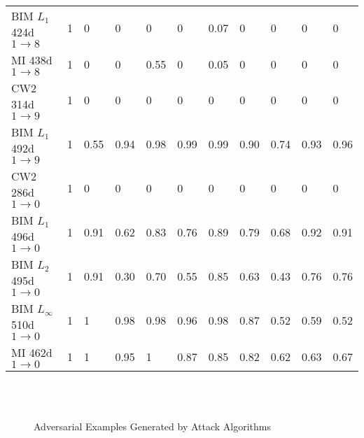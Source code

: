 \documentclass[12pt]{article}
\begin{document}
\begin{table}[t]
\begin{center}
{\begin{tabular}{|l|llllllllll|}
BIM $L_1$ 424d $1\to 8$& 1 & 0 & 0 & 0 & 0 & 0.07 & 0 & 0 & 0 & 0 \\
MI 438d $1\to 8$& 1 & 0 & 0 & 0.55 & 0 & 0.05 & 0 & 0 & 0 & 0 \\\hline
CW2 314d $1\to 9$& 1 & 0 & 0 & 0 & 0 & 0 & 0 & 0 & 0 & 0\\
BIM $L_1$ 492d $1\to 9$& 1 & 0.55 & 0.94 & 0.98 & 0.99 & 0.99 & 0.90 & 0.74 & 0.93 & 0.96 \\\hline
CW2 286d $1\to 0$ & 1 & 0 & 0 & 0 & 0 & 0 & 0 & 0 & 0 & 0\\
BIM $L_1$ 496d $1\to 0$& 1 & 0.91 & 0.62 & 0.83 & 0.76 & 0.89 & 0.79 &0.68 & 0.92 & 0.91 \\
BIM $L_2$ 495d $1\to 0$& 1 & 0.91 & 0.30 & 0.70 & 0.55 & 0.85 & 0.63 & 0.43 & 0.76 & 0.76\\
BIM $L_{\infty}$ 510d $1\to 0$& 1 & 1 & 0.98 & 0.98 & 0.96 & 0.98 & 0.87 & 0.52 & 0.59 & 0.52 \\
MI 462d $1\to 0$& 1 & 1 & 0.95 & 1 & 0.87 & 0.85 & 0.82 & 0.62 & 0.63& 0.67 \\
\hline
\end{tabular} }
\end{center}
\end{table}


%
\begin{figure}[t]
\centering
{}
\centering
{}
\centering
{}
\\
\centering
{}
\centering
{}
\centering
{}
\\
\centering
{}
\centering
{}
\centering
{}
\caption{Adversarial Examples Generated by Attack Algorithms}
\label{fig:attack-images}
\end{figure}
\end{document}
